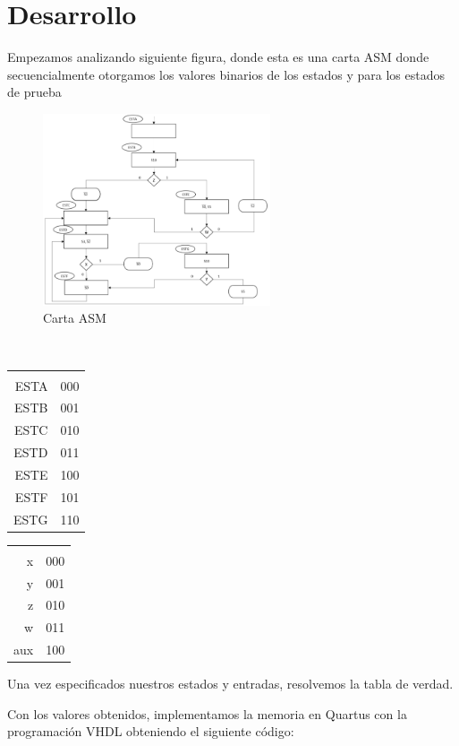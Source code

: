 \documentclass[table]{scrartcl}
\begin{document}
\section{Desarrollo}
\label{sec:orgac7043c}
Empezamos analizando siguiente figura, donde esta es una carta ASM
donde secuencialmente otorgamos los valores binarios de los estados y para
los estados de prueba
\begin{figure}[htbp]
  \centering
  \includegraphics[width=0.6\textwidth]{./img/2.png}
  \caption{\label{fig:2}Carta ASM}
\end{figure}
\\
\begin{center}
    \label{tab:1}
  \begin{tabular}{rl}
    \multicolumn{2}{c}{\cellcolor[HTML]{EA4335}{\color[HTML]{FFFFFF} \textbf{Entradas}}} \\
    ESTA & 000 \\
    ESTB & 001 \\
    ESTC & 010 \\
    ESTD & 011 \\
    ESTE & 100 \\
    ESTF & 101 \\
    ESTG & 110
\end{tabular}
\end{center}
\begin{center}
  \label{tab:2}
\begin{tabular}{rl}
\multicolumn{2}{c}{\cellcolor[HTML]{EA4335}{\color[HTML]{FFFFFF} \textbf{Prueba}}} \\
x & 000 \\
y & 001 \\
z & 010 \\
w & 011 \\
aux & 100
\end{tabular}
\end{center}
Una vez especificados nuestros estados y entradas, resolvemos la tabla de
verdad.
\begin{center}
  \label{tab:3}
  \scriptsize
  
\end{center}
Con los valores obtenidos, implementamos la memoria en Quartus con la
programación VHDL obteniendo el siguiente código:
\end{document}
